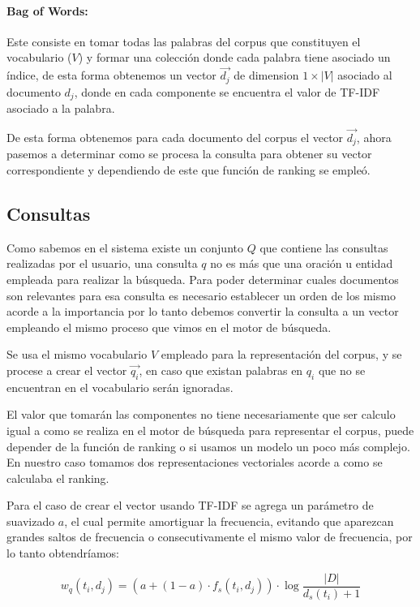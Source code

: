 \documentclass[runningheads,a4paper]{llncs}
\begin{document}
\paragraph*{Bag of Words:} Este consiste en tomar todas las palabras del corpus que constituyen el vocabulario ($V$) y formar una colección donde cada palabra tiene asociado un índice, de esta forma obtenemos un vector $\overrightarrow{d_j}$ de dimension $1 \times |V|$ asociado al documento $d_j$, donde en cada componente se encuentra el valor de TF-IDF asociado a la palabra.

De esta forma obtenemos para cada documento del corpus el vector $\overrightarrow{d_j}$, ahora pasemos a determinar como se procesa la consulta para obtener su vector correspondiente y dependiendo de este que función de ranking se empleó.

\subsection*{Consultas}

Como sabemos en el sistema existe un conjunto $Q$ que contiene las consultas realizadas por el usuario, una consulta $q$ no es más que una oración u entidad empleada para realizar la búsqueda. Para poder determinar cuales documentos son relevantes para esa consulta es necesario establecer un orden de los mismo acorde a la importancia por lo tanto debemos convertir la consulta a un vector empleando el mismo proceso que vimos en el motor de búsqueda.

Se usa el mismo vocabulario $V$ empleado para la representación del corpus, y se procese a crear el vector $\overrightarrow{q_i}$, en caso que existan palabras en $q_i$ que no se encuentran en el vocabulario serán ignoradas. 

El valor que tomarán las componentes no tiene necesariamente que ser calculo igual a como se realiza en el motor de búsqueda para representar el corpus, puede depender de la función de ranking o si usamos un modelo un poco más complejo. En nuestro caso tomamos dos representaciones vectoriales acorde a como se calculaba el ranking.

Para el caso de crear el vector usando TF-IDF se agrega un parámetro de suavizado $a$, el cual permite amortiguar la frecuencia, evitando que aparezcan grandes saltos de frecuencia o consecutivamente el mismo valor de frecuencia, por lo tanto obtendríamos:

\begin{equation}
	w_q(t_i, d_j) = \left( a + (1 - a)  · f_s(t_i, d_j) \right) \cdot \log{\frac{|D|}{d_s(t_i) + 1}}	
\end{equation}
\end{document}
